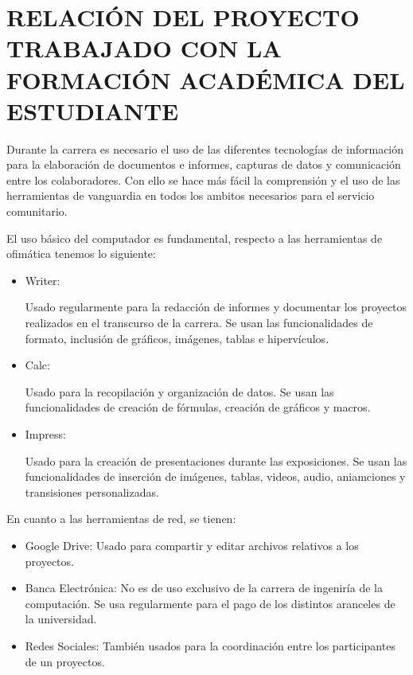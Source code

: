 \chapter{RELACIÓN DEL PROYECTO TRABAJADO CON LA FORMACIÓN ACADÉMICA	DEL ESTUDIANTE}

    Durante la carrera es necesario el uso de las diferentes tecnologías de información para la elaboración de documentos e informes, capturas de datos y comunicación entre los colaboradores. Con ello se hace más fácil la comprensión y el uso de las herramientas de vanguardia en todos los ambitos necesarios para el servicio comunitario.
    
    El uso básico del computador es fundamental, respecto a las herramientas de ofimática tenemos lo siguiente:

    \begin{itemize}
        \item Writer:
        
        Usado regularmente para la redacción de informes y documentar los proyectos realizados en el transcurso de la carrera. Se usan las funcionalidades de formato, inclusión de gráficos, imágenes, tablas e hipervículos.
        
        \item Calc:
        
        Usado para la recopilación y organización de datos. Se usan las funcionalidades de creación de fórmulas, creación de gráficos y macros.
        
        \item Impress:
        
        Usado para la creación de presentaciones durante las exposiciones. Se usan las funcionalidades de inserción de imágenes, tablas, videos, audio, aniamciones y transisiones personalizadas.
    \end{itemize}
    
    En cuanto a las herramientas de red, se tienen:
    
    \begin{itemize}
        \item Google Drive:
        Usado para compartir y editar archivos relativos a los proyectos.
        \item Banca Electrónica:
        No es de uso exclusivo de la carrera de ingeniría de la computación. Se usa regularmente para el pago de los distintos aranceles de la universidad.
        \item Redes Sociales:
        También usados para la coordinación entre los participantes de un proyectos.
    \end{itemize}
 
\pagebreak